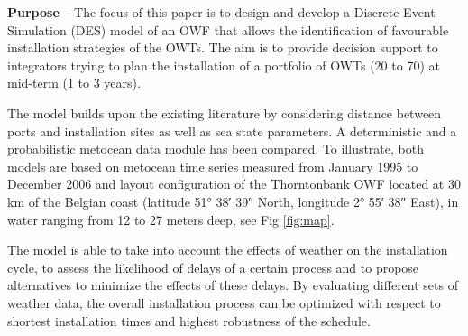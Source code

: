 \textbf{Purpose} --
The focus of this paper is to design and develop a Discrete-Event Simulation (DES) model of an OWF that allows the identification of favourable installation strategies of the OWTs. The aim is to provide decision support to integrators trying to plan the installation of a portfolio of OWTs (20 to 70) at mid-term (1 to 3 years).


The model builds upon the existing literature by considering distance between ports and installation sites as well as sea state parameters. A deterministic and a probabilistic metocean data module has been compared. To illustrate, both models are based on metocean time series measured from January 1995 to December 2006 and layout configuration of the Thorntonbank OWF located at 30 km of the Belgian coast (latitude 51° 38′ 39″ North, longitude 2° 55′ 38″ East), in water ranging from 12 to 27 meters deep, see Fig \ref{fig:map}.

The model is able to take into account the effects of weather on the installation cycle, to assess the likelihood of delays of a certain process and to propose alternatives to minimize the effects of these delays. By evaluating different sets of weather data, the overall installation process can be optimized with respect to shortest installation times and highest robustness of the schedule. %


